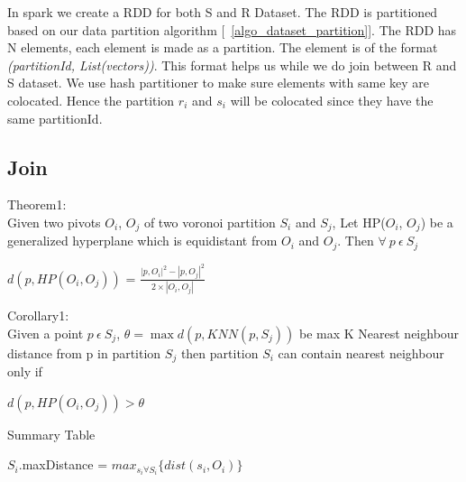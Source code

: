 In spark we create a RDD for both S and R Dataset. The RDD is
partitioned based on our data partition algorithm
[~\ref{algo_dataset_partition}]. The RDD has N elements, each element is
made as a partition. The element is of
the format \emph{(partitionId, List(vectors))}. This format helps us
while we do join between R and S dataset. We use hash partitioner to
make sure elements with same key are colocated. Hence the partition $r_i$ and
$s_i$ will be colocated since they have the same partitionId.

\subsection{Join}

\medskip

Theorem1: \cite{lu_efficient_2012} \\

Given two pivots $O_i$, $O_j$ of two voronoi
partition $S_i$ and $S_j$, Let HP($O_i$, $O_j$) be a generalized
hyperplane which is equidistant from $O_i$ and $O_j$. Then $\forall\ p\
\epsilon\ S_j$

\medskip

\begin{center}

$d(p, HP(O_i, O_j))$ = $\frac{|p, O_i|^2 - |p, O_j|^2}{2 \times |O_i, O_j|}$

\end{center}

\bigskip

Corollary1: \\

Given a point $p\ \epsilon\ S_j$, $\theta = \max{d(p, KNN(p, S_j))}$ be max K Nearest
neighbour distance from p in partition $S_j$ then partition
$S_i$ can contain nearest neighbour only if

\medskip

\begin{center}

$d(p, HP(O_i, O_j)) > \theta $

\end{center}

\medskip

\begin{algorithm}
  \caption{Summary Table}
  \label{algo_generate_summary}
  \begin{algorithmic}[1]
    \STATE $S_i$.maxDistance = $max_{s_i \forall S_i}\{dist(s_i, O_i)\}$
    \ENDFOR
  \end{algorithmic}
\end{algorithm}


